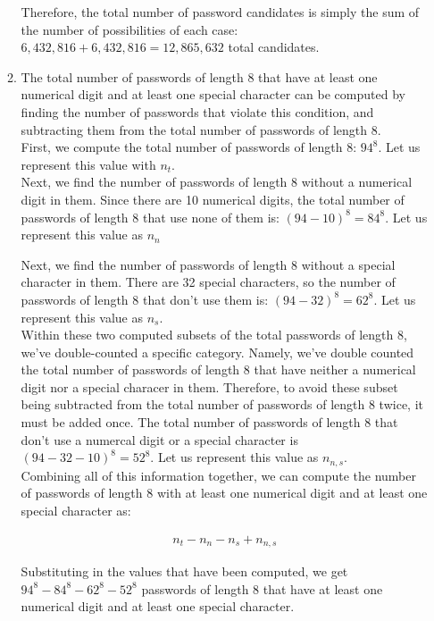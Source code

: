 \documentclass[11pt]{article}
\theoremstyle{definition}
\begin{document}
\begin{enumerate}
\begin{enumerate}
Therefore, the total number of password candidates is simply the sum of the number of possibilities of each case: $6,432,816 + 6,432,816 = 12,865,632$ total candidates.\\

\item The total number of passwords of length 8 that have at least one numerical digit and at least one special character can be computed by finding the number of passwords that
violate this condition, and subtracting them from the total number of passwords of length 8.\\ 

First, we compute the total number of passwords of length 8: $94^8$. Let us represent this value with $n_t$.\\

Next, we find the number of passwords of length 8 without a numerical digit in them. Since there are 10 numerical digits, the total number of passwords of length 8 that use none of them is:
$(94-10)^8 = 84^8$. Let us represent this value as $n_n$

Next, we find the number of passwords of length 8 without a special character in them. There are 32 special characters, so the number of passwords of length 8 
that don't use them is: $(94-32)^8 = 62^8$. Let us represent this value as $n_s$.\\

Within these two computed subsets of the total passwords of length 8, we've double-counted a specific category. 
Namely, we've double counted the total number of passwords of length 8 that have neither a numerical digit nor a special characer in them. 
Therefore, to avoid these subset being subtracted from the total number of passwords of length 8 twice, it must be added once. The total number of passwords of 
length 8 that don't use a numercal digit or a special character is $(94 - 32 - 10)^8 = 52^8$. Let us represent this value as $n_{n,s}$.\\ 

Combining all of this information together, we can compute the number of passwords of length 8 with at least one numerical digit and at least one special character as:

\begin{align*}
n_t - n_n - n_s + n_{n,s}
\end{align*}

Substituting in the values that have been computed, we get $94^8 - 84^8 - 62^8 - 52^8$ passwords of length 8 that have at least one numerical digit and at least one special character.\\


\end{enumerate}
\end{enumerate}
\end{document}
